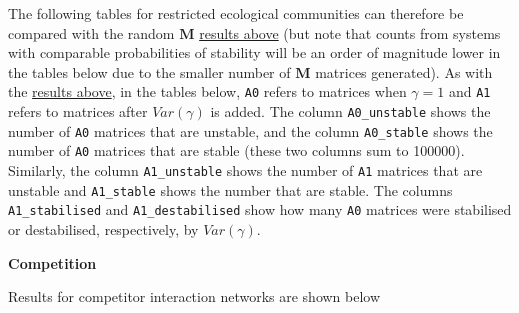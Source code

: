 \documentclass[]{article}
\begin{document}
The following tables for restricted ecological communities can therefore
be compared with the random \(\mathbf{M}\)
\protect\hyperlink{IncrS}{results above} (but note that counts from
systems with comparable probabilities of stability will be an order of
magnitude lower in the tables below due to the smaller number of
\(\mathbf{M}\) matrices generated). As with the
\protect\hyperlink{IncrS}{results above}, in the tables below,
\texttt{A0} refers to matrices when \(\gamma = 1\) and \texttt{A1}
refers to matrices after \(Var(\gamma)\) is added. The column
\texttt{A0\_unstable} shows the number of \texttt{A0} matrices that are
unstable, and the column \texttt{A0\_stable} shows the number of
\texttt{A0} matrices that are stable (these two columns sum to 100000).
Similarly, the column \texttt{A1\_unstable} shows the number of
\texttt{A1} matrices that are unstable and \texttt{A1\_stable} shows the
number that are stable. The columns \texttt{A1\_stabilised} and
\texttt{A1\_destabilised} show how many \texttt{A0} matrices were
stabilised or destabilised, respectively, by \(Var(\gamma)\).

\textbf{Competition}

Results for competitor interaction networks are shown below
\end{document}
